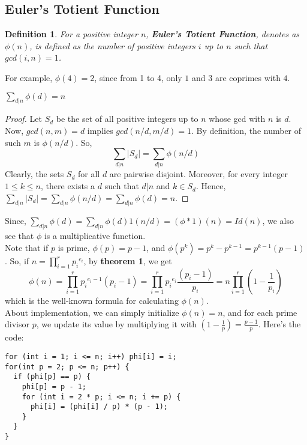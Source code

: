 \documentclass[11pt]{article}
\newtheorem{definition}{Definition}[section]
\begin{document}
\subsection{Euler's Totient Function}
\begin{definition}
  For a positive integer $n$, \textbf{Euler's Totient Function}, denotes as $\phi(n)$, is defined as the number of positive integers $i$ up to $n$ such that $gcd(i, n) = 1$.
\end{definition}
For example, $\phi(4) = 2$, since from 1 to 4, only $1$ and $3$ are coprimes with $4$.
\begin{theorem}
  $\sum_{d|n} \phi(d) = n$
\end{theorem}
\begin{proof}
  Let $S_d$ be the set of all positive integers up to $n$ whose gcd with $n$ is $d$. Now, $gcd(n, m) = d$ implies $gcd(n/d, m/d) = 1$. By definition, the number of such $m$ is $\phi(n / d)$. So,
  $$ \sum_{d|n} |S_d| = \sum_{d|n} \phi(n / d)$$
  Clearly, the sets $S_d$ for all $d$ are pairwise disjoint. Moreover, for every integer $1 \leq k \leq n$, there exists a $d$ such that $d|n$ and $k \in S_d$. Hence, $\sum_{d|n} |S_d| = \sum_{d|n} \phi(n / d) = \sum_{d|n} \phi(d) = n$.
\end{proof}
Since, $\sum_{d|n}\phi(d) = \sum_{d|n} \phi(d) 1(n / d) = (\phi * 1)(n) = Id(n)$, we also see that $\phi$ is a multiplicative function. \\
Note that if $p$ is prime, $\phi(p) = p - 1$, and $\phi(p^k) = p^k - p^{k - 1} = p^{k - 1}(p - 1)$. So, if $n = \prod_{i = 1}^{r} {p_i}^{e_i}$, by \textbf{theorem 1}, we get 
$$\phi(n) = \prod_{i = 1}^{r} {p_i}^{e_i - 1}(p_i - 1) = \prod_{i = 1}^{r} {p_i}^{e_i} \frac{(p_i - 1)}{p_i} = n \prod_{i = 1}^{r} (1 - \frac{1}{p_i})$$
which is the well-known formula for calculating $\phi(n)$.
\\About implementation, we can simply initialize $\phi(n) = n$, and for each prime divisor $p$, we update its value by multiplying it with $(1 - \frac{1}{p}) = \frac{p - 1}{p}$. Here's the code: 
\begin{verbatim}
for (int i = 1; i <= n; i++) phi[i] = i; 
for(int p = 2; p <= n; p++) {
  if (phi[p] == p) {
    phi[p] = p - 1;
    for (int i = 2 * p; i <= n; i += p) {
      phi[i] = (phi[i] / p) * (p - 1);
    }
  }
}
\end{verbatim}
\end{document}
